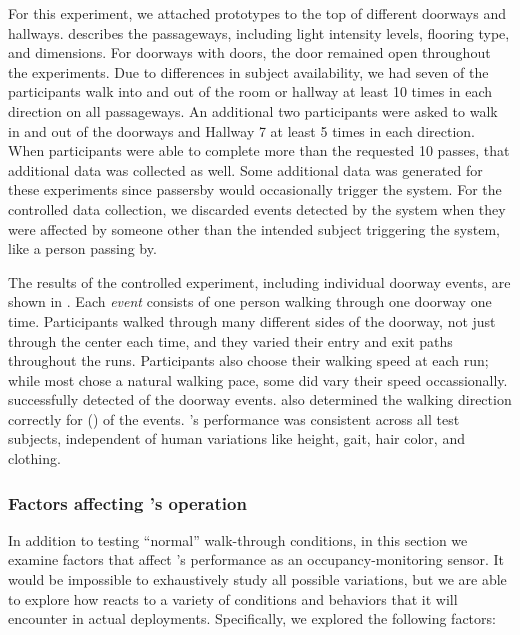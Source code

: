 For this experiment, we attached \sysname prototypes to the top of \numDoors different doorways and hallways.
 describes the passageways, including light intensity levels, flooring type, and dimensions.
For doorways with doors, the door remained open throughout the experiments.
Due to differences in subject availability, we had seven of the participants walk into and out of the room or hallway at least 10 times in each direction on all \numDoors passageways.  An additional two participants were asked to walk in and out of the doorways and Hallway 7 at least 5 times in each direction.  When participants were able to complete more than the requested 10 passes, that additional data was collected as well.  Some additional data was generated for these experiments since passersby would occasionally trigger the system.  For the controlled data collection, we discarded events detected by the system when they were affected by someone other than the intended subject triggering the system, like a person passing by.

The results of the controlled experiment, including \numExp individual doorway events, are shown in .
Each \textit{event} consists of one person walking through one doorway one time.  Participants walked through many different sides of the doorway, not just through the center each time, and they varied their entry and exit paths throughout the runs.
Participants also choose their walking speed at each run; while most chose a natural walking pace, some did vary their speed occassionally. 
\sysname successfully detected \SysAccuracy of the \numExp doorway events.
\sysname also determined the walking direction correctly for \numDir (\dirAccuracy) of the events.
\sysname's performance was consistent across all test subjects, independent of human variations like height, gait, hair color, and clothing.



\subsubsection{Factors affecting \sysname's operation}
\label{sec:confounding}

In addition to testing ``normal'' walk-through conditions, in this section we examine factors that affect \sysname's performance as an occupancy-monitoring sensor.
It would be impossible to exhaustively study all possible variations, but we are able to explore how \sysname reacts to a variety of conditions and behaviors that it will encounter in actual deployments.
Specifically, we explored the following factors:


